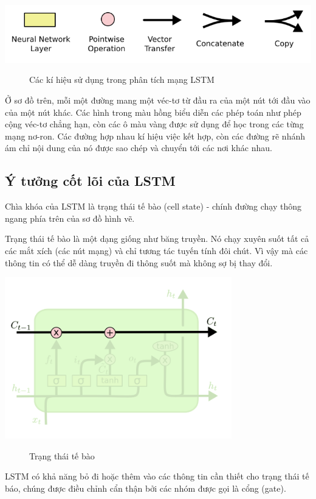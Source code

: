 \begin{center}
    \includegraphics[scale=.3]{image/chapter6/lstm3.png}
    \begin{figure}[htp]
    \begin{center}
     
    \end{center}
    \caption{Các kí hiệu sử dụng trong phân tích mạng LSTM}
    \end{figure}
\end{center}
Ở sơ đồ trên, mỗi một đường mang một véc-tơ từ đầu ra của một nút tới đầu vào của một nút khác. Các hình trong màu hồng biểu diễn các phép toán như phép cộng véc-tơ chẳng hạn, còn các ô màu vàng được sử dụng để học trong các từng mạng nơ-ron. Các đường hợp nhau kí hiệu việc kết hợp, còn các đường rẽ nhánh ám chỉ nội dung của nó được sao chép và chuyển tới các nơi khác nhau.


\subsection{Ý tưởng cốt lõi của LSTM}
Chìa khóa của LSTM là trạng thái tế bào (cell state) - chính đường chạy thông ngang phía trên của sơ đồ hình vẽ.

Trạng thái tế bào là một dạng giống như băng truyền. Nó chạy xuyên suốt tất cả các mắt xích (các nút mạng) và chỉ tương tác tuyến tính đôi chút. Vì vậy mà các thông tin có thể dễ dàng truyền đi thông suốt mà không sợ bị thay đổi.
\begin{center}
    \includegraphics[scale=.5]{image/chapter6/yn1.png}
    \begin{figure}[htp]
    \begin{center}
     
    \end{center}
    \caption{Trạng thái tế bào}
    \end{figure}
\end{center}
LSTM có khả năng bỏ đi hoặc thêm vào các thông tin cần thiết cho trạng thái tế báo, chúng được điều chỉnh cẩn thận bởi các nhóm được gọi là cổng (gate).


